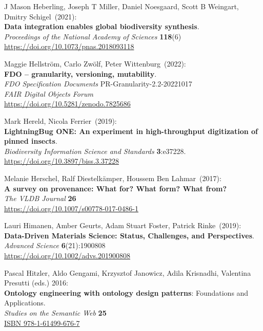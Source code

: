 \begin{thebibliography}{9}
J Mason Heberling, Joseph T Miller, Daniel Noesgaard, Scott B Weingart, Dmitry Schigel~(2021): \\
\textbf{Data integration enables global biodiversity synthesis}.\\
\emph{Proceedings of the National Academy of Sciences} \textbf{118}(6)\\
\url{https://doi.org/10.1073/pnas.2018093118}

Maggie Hellström, Carlo Zwölf, Peter Wittenburg~(2022): \\
\textbf{FDO -- granularity, versioning, mutability}. \\
\emph{FDO Specification Documents} PR-Granularity-2.2-20221017\\
\emph{FAIR Digital Objects Forum}\\
\url{https://doi.org/10.5281/zenodo.7825686}

Mark Hereld, Nicola Ferrier~(2019): \\
\textbf{LightningBug ONE: An experiment in high-throughput digitization of pinned insects}.\\
\emph{Biodiversity Information Science and Standards} \textbf{3}:e37228.\\
\url{https://doi.org/10.3897/biss.3.37228}

Melanie Herschel, Ralf Diestelkämper, Houssem Ben Lahmar~(2017): \\
\textbf{A survey on provenance: What for? What form? What from?}\\
\emph{The VLDB Journal} \textbf{26}\\
\url{https://doi.org/10.1007/s00778-017-0486-1}

Lauri Himanen, Amber Geurts, Adam Stuart Foster, Patrick Rinke~(2019): \\
\textbf{Data-Driven Materials Science: Status, Challenges, and Perspectives}.\\
\emph{Advanced Science} \textbf{6}(21):1900808\\
\url{https://doi.org/10.1002/advs.201900808}

Pascal Hitzler, Aldo Gengami, Krzysztof Janowicz, Adila Krisnadhi, Valentina Presutti (eds.) 2016:\\
\textbf{Ontology engineering with ontology design patterns}: Foundations and Applications.\\
\emph{Studies on the Semantic Web} \textbf{25}\\
\href{https://identifiers.org/isbn/9781614996767 }{ISBN 978-1-61499-676-7}


\end{thebibliography}

